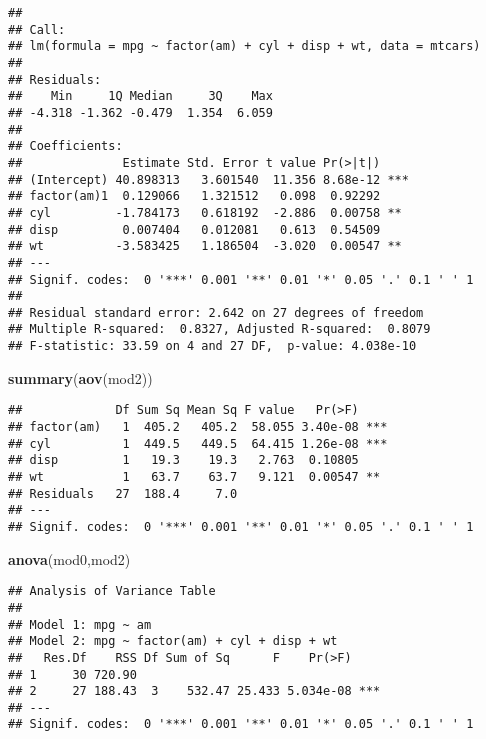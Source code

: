 \documentclass[]{article}
\newenvironment{Shaded}{\begin{snugshade}}{\end{snugshade}}
\newcommand{\KeywordTok}[1]{\textcolor[rgb]{0.13,0.29,0.53}{\textbf{#1}}}
\newcommand{\NormalTok}[1]{#1}
\begin{document}
\begin{verbatim}
## 
## Call:
## lm(formula = mpg ~ factor(am) + cyl + disp + wt, data = mtcars)
## 
## Residuals:
##    Min     1Q Median     3Q    Max 
## -4.318 -1.362 -0.479  1.354  6.059 
## 
## Coefficients:
##              Estimate Std. Error t value Pr(>|t|)    
## (Intercept) 40.898313   3.601540  11.356 8.68e-12 ***
## factor(am)1  0.129066   1.321512   0.098  0.92292    
## cyl         -1.784173   0.618192  -2.886  0.00758 ** 
## disp         0.007404   0.012081   0.613  0.54509    
## wt          -3.583425   1.186504  -3.020  0.00547 ** 
## ---
## Signif. codes:  0 '***' 0.001 '**' 0.01 '*' 0.05 '.' 0.1 ' ' 1
## 
## Residual standard error: 2.642 on 27 degrees of freedom
## Multiple R-squared:  0.8327, Adjusted R-squared:  0.8079 
## F-statistic: 33.59 on 4 and 27 DF,  p-value: 4.038e-10
\end{verbatim}

\begin{Shaded}
\begin{Highlighting}[]
\KeywordTok{summary}\NormalTok{(}\KeywordTok{aov}\NormalTok{(mod2))}
\end{Highlighting}
\end{Shaded}

\begin{verbatim}
##             Df Sum Sq Mean Sq F value   Pr(>F)    
## factor(am)   1  405.2   405.2  58.055 3.40e-08 ***
## cyl          1  449.5   449.5  64.415 1.26e-08 ***
## disp         1   19.3    19.3   2.763  0.10805    
## wt           1   63.7    63.7   9.121  0.00547 ** 
## Residuals   27  188.4     7.0                     
## ---
## Signif. codes:  0 '***' 0.001 '**' 0.01 '*' 0.05 '.' 0.1 ' ' 1
\end{verbatim}

\begin{Shaded}
\begin{Highlighting}[]
\KeywordTok{anova}\NormalTok{(mod0,mod2)}
\end{Highlighting}
\end{Shaded}

\begin{verbatim}
## Analysis of Variance Table
## 
## Model 1: mpg ~ am
## Model 2: mpg ~ factor(am) + cyl + disp + wt
##   Res.Df    RSS Df Sum of Sq      F    Pr(>F)    
## 1     30 720.90                                  
## 2     27 188.43  3    532.47 25.433 5.034e-08 ***
## ---
## Signif. codes:  0 '***' 0.001 '**' 0.01 '*' 0.05 '.' 0.1 ' ' 1
\end{verbatim}
\end{document}
